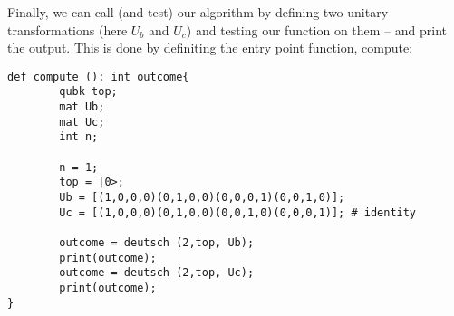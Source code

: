 Finally, we can call (and test) our algorithm by defining two unitary transformations (here $U_b$ and $U_c$) and testing our function on them -- and print the output. This is done by definiting the entry point function, \textsf{compute}:
\begin{lstlisting}
def compute (): int outcome{
        qubk top;
        mat Ub;
        mat Uc;
        int n;
        
        n = 1;
        top = |0>;
        Ub = [(1,0,0,0)(0,1,0,0)(0,0,0,1)(0,0,1,0)];
        Uc = [(1,0,0,0)(0,1,0,0)(0,0,1,0)(0,0,0,1)]; # identity

        outcome = deutsch (2,top, Ub);
        print(outcome);
        outcome = deutsch (2,top, Uc);
        print(outcome);
}
\end{lstlisting}
%
